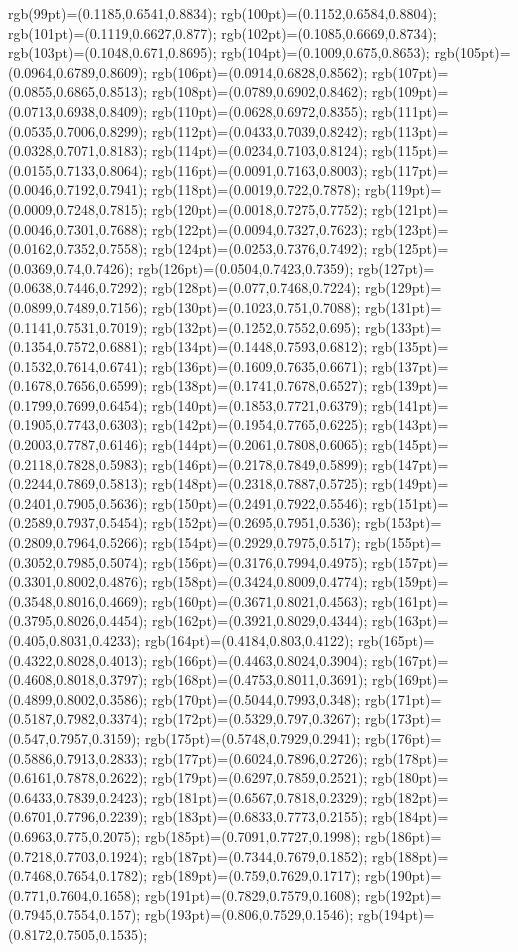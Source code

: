 rgb(99pt)=(0.1185,0.6541,0.8834); rgb(100pt)=(0.1152,0.6584,0.8804); rgb(101pt)=(0.1119,0.6627,0.877); rgb(102pt)=(0.1085,0.6669,0.8734); rgb(103pt)=(0.1048,0.671,0.8695); rgb(104pt)=(0.1009,0.675,0.8653); rgb(105pt)=(0.0964,0.6789,0.8609); rgb(106pt)=(0.0914,0.6828,0.8562); rgb(107pt)=(0.0855,0.6865,0.8513); rgb(108pt)=(0.0789,0.6902,0.8462); rgb(109pt)=(0.0713,0.6938,0.8409); rgb(110pt)=(0.0628,0.6972,0.8355); rgb(111pt)=(0.0535,0.7006,0.8299); rgb(112pt)=(0.0433,0.7039,0.8242); rgb(113pt)=(0.0328,0.7071,0.8183); rgb(114pt)=(0.0234,0.7103,0.8124); rgb(115pt)=(0.0155,0.7133,0.8064); rgb(116pt)=(0.0091,0.7163,0.8003); rgb(117pt)=(0.0046,0.7192,0.7941); rgb(118pt)=(0.0019,0.722,0.7878); rgb(119pt)=(0.0009,0.7248,0.7815); rgb(120pt)=(0.0018,0.7275,0.7752); rgb(121pt)=(0.0046,0.7301,0.7688); rgb(122pt)=(0.0094,0.7327,0.7623); rgb(123pt)=(0.0162,0.7352,0.7558); rgb(124pt)=(0.0253,0.7376,0.7492); rgb(125pt)=(0.0369,0.74,0.7426); rgb(126pt)=(0.0504,0.7423,0.7359); rgb(127pt)=(0.0638,0.7446,0.7292); rgb(128pt)=(0.077,0.7468,0.7224); rgb(129pt)=(0.0899,0.7489,0.7156); rgb(130pt)=(0.1023,0.751,0.7088); rgb(131pt)=(0.1141,0.7531,0.7019); rgb(132pt)=(0.1252,0.7552,0.695); rgb(133pt)=(0.1354,0.7572,0.6881); rgb(134pt)=(0.1448,0.7593,0.6812); rgb(135pt)=(0.1532,0.7614,0.6741); rgb(136pt)=(0.1609,0.7635,0.6671); rgb(137pt)=(0.1678,0.7656,0.6599); rgb(138pt)=(0.1741,0.7678,0.6527); rgb(139pt)=(0.1799,0.7699,0.6454); rgb(140pt)=(0.1853,0.7721,0.6379); rgb(141pt)=(0.1905,0.7743,0.6303); rgb(142pt)=(0.1954,0.7765,0.6225); rgb(143pt)=(0.2003,0.7787,0.6146); rgb(144pt)=(0.2061,0.7808,0.6065); rgb(145pt)=(0.2118,0.7828,0.5983); rgb(146pt)=(0.2178,0.7849,0.5899); rgb(147pt)=(0.2244,0.7869,0.5813); rgb(148pt)=(0.2318,0.7887,0.5725); rgb(149pt)=(0.2401,0.7905,0.5636); rgb(150pt)=(0.2491,0.7922,0.5546); rgb(151pt)=(0.2589,0.7937,0.5454); rgb(152pt)=(0.2695,0.7951,0.536); rgb(153pt)=(0.2809,0.7964,0.5266); rgb(154pt)=(0.2929,0.7975,0.517); rgb(155pt)=(0.3052,0.7985,0.5074); rgb(156pt)=(0.3176,0.7994,0.4975); rgb(157pt)=(0.3301,0.8002,0.4876); rgb(158pt)=(0.3424,0.8009,0.4774); rgb(159pt)=(0.3548,0.8016,0.4669); rgb(160pt)=(0.3671,0.8021,0.4563); rgb(161pt)=(0.3795,0.8026,0.4454); rgb(162pt)=(0.3921,0.8029,0.4344); rgb(163pt)=(0.405,0.8031,0.4233); rgb(164pt)=(0.4184,0.803,0.4122); rgb(165pt)=(0.4322,0.8028,0.4013); rgb(166pt)=(0.4463,0.8024,0.3904); rgb(167pt)=(0.4608,0.8018,0.3797); rgb(168pt)=(0.4753,0.8011,0.3691); rgb(169pt)=(0.4899,0.8002,0.3586); rgb(170pt)=(0.5044,0.7993,0.348); rgb(171pt)=(0.5187,0.7982,0.3374); rgb(172pt)=(0.5329,0.797,0.3267); rgb(173pt)=(0.547,0.7957,0.3159); rgb(175pt)=(0.5748,0.7929,0.2941); rgb(176pt)=(0.5886,0.7913,0.2833); rgb(177pt)=(0.6024,0.7896,0.2726); rgb(178pt)=(0.6161,0.7878,0.2622); rgb(179pt)=(0.6297,0.7859,0.2521); rgb(180pt)=(0.6433,0.7839,0.2423); rgb(181pt)=(0.6567,0.7818,0.2329); rgb(182pt)=(0.6701,0.7796,0.2239); rgb(183pt)=(0.6833,0.7773,0.2155); rgb(184pt)=(0.6963,0.775,0.2075); rgb(185pt)=(0.7091,0.7727,0.1998); rgb(186pt)=(0.7218,0.7703,0.1924); rgb(187pt)=(0.7344,0.7679,0.1852); rgb(188pt)=(0.7468,0.7654,0.1782); rgb(189pt)=(0.759,0.7629,0.1717); rgb(190pt)=(0.771,0.7604,0.1658); rgb(191pt)=(0.7829,0.7579,0.1608); rgb(192pt)=(0.7945,0.7554,0.157); rgb(193pt)=(0.806,0.7529,0.1546); rgb(194pt)=(0.8172,0.7505,0.1535); 